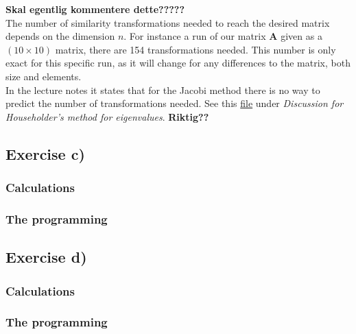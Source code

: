 \documentclass{article}
\begin{document}
\textbf{Skal egentlig kommentere dette?????} \\

The number of similarity transformations needed to reach the desired matrix depends on the dimension $n$. For instance a run of our matrix \textbf{A} given as a $(10 \times 10)$ matrix, there are 154 transformations needed. This number is only exact for this specific run, as it will change for any differences to the matrix, both size and elements. \\

In the lecture notes it states that for the Jacobi method there is no way to predict the number of transformations needed. See this \href{http://compphysics.github.io/ComputationalPhysics/doc/pub/eigvalues/html/eigvalues.html}{file} under \textit{Discussion for Householder's method for eigenvalues}. \textbf{Riktig??} \\



\subsection{Exercise c)} \label{sec:Method c)}

  \subsubsection{Calculations}




  \subsubsection{The programming}




\subsection{Exercise d)} \label{sec:Method d)}

  \subsubsection{Calculations}




  \subsubsection{The programming}
\end{document}
